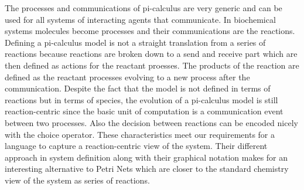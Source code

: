 The processes and communications of pi-calculus are very generic and
can be used for all systems of interacting agents that communicate. In
biochemical systems molecules become processes and their communications
are the reactions. Defining a pi-calculus model is not a straight
translation from a series of reactions because reactions are broken
down to a send and receive part which are then defined as actions for
the reactant proesses. The products of the reaction are defined as the
reactant processes evolving to a new process after the
communication. Despite the fact that the model is not defined in
terms of reactions but in terms of species, the evolution of a
pi-calculus model is still reaction-centric since the basic unit of
computation is a communication event between two processes. Also
the decision between reactions can be encoded nicely with the choice
operator. These characteristics meet our requirements for a language
to capture a reaction-centric view of the system. Their different
approach in system definition along with their graphical notation
makes for an interesting alternative to Petri Nets which are closer to
the standard chemistry view of the system as series of reactions.
